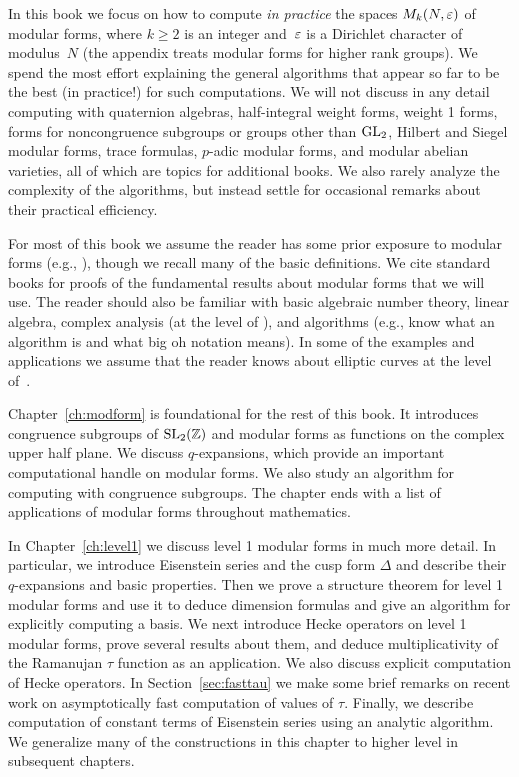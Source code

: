 In this book we focus on how to compute {\em in practice} the spaces
$M_k(N,\varepsilon)$ of modular forms, where $k\geq 2$ is an integer
and~$\varepsilon$ is a Dirichlet character of modulus~$N$ (the appendix
treats modular forms for higher rank groups).  We spend the most
effort explaining the general algorithms that appear so far to be the best (in
practice!) for such computations.  We will not discuss in any detail
computing with quaternion algebras,
half-integral weight forms, weight 1 forms, forms for
noncongruence subgroups or groups other than $\operatorname{GL}_2$, Hilbert and
Siegel modular forms, trace formulas, $p$-adic modular forms, and
modular abelian varieties, all of which are topics for additional
books.  We also rarely analyze the complexity of the
algorithms, but instead settle for occasional remarks about their
practical efficiency.  


For most of this book we assume the reader has some prior exposure to
modular forms (e.g., \cite{diamond-shurman}), though we recall many of
the basic definitions.  We cite standard books for proofs of the
fundamental results about modular forms that we will use.  The reader
should also be familiar with basic algebraic number theory, linear
algebra, complex analysis (at the level of \cite{ahlfors}), and
algorithms (e.g., know what an algorithm is and what big oh notation
means). In some of the examples and applications we assume that the
reader knows about elliptic curves at the level
of~\cite{silverman:aec}.


Chapter~\ref{ch:modform} is foundational for the rest of this book.  It
introduces congruence subgroups of $\operatorname{SL}_2(\mathbb{Z})$ and modular forms as
functions on the complex upper half plane.  We discuss $q$-expansions,
which provide an important computational handle on modular forms.  We
also study an algorithm for computing with congruence subgroups.  The
chapter ends with a list of applications of modular forms throughout
mathematics.

In Chapter~\ref{ch:level1} we discuss level 1 modular forms in much
more detail.  In particular, we introduce Eisenstein series and the
cusp form $\Delta$ and describe their $q$-expansions and basic
properties.  Then we prove a structure theorem for level 1 modular
forms and use it to deduce dimension formulas and give an algorithm
for explicitly computing a basis.  We next introduce Hecke operators
on level 1 modular forms, prove several results about them, and deduce
multiplicativity of the Ramanujan $\tau$ function as an application.
We also discuss explicit computation of Hecke operators.  
In Section~\ref{sec:fasttau} we make some brief remarks on
recent work on asymptotically fast computation of
values of $\tau$. Finally, we describe computation of constant terms
of Eisenstein series using an analytic algorithm.  We generalize many
of the constructions in this chapter to higher level in subsequent
chapters.


